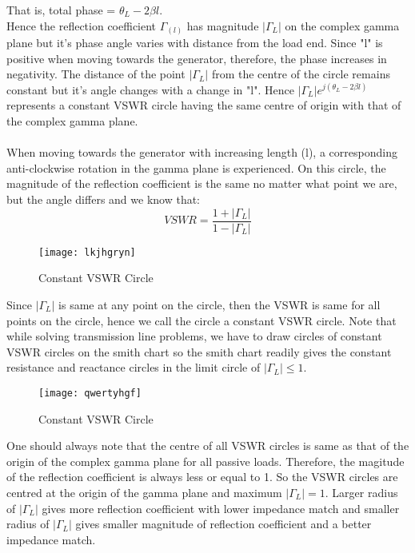 	That is, total phase = $\theta_L - 2\beta{l}$.\\
	Hence the reflection coefficient $\Gamma_{(l)}$ has magnitude $|\Gamma_L|$ on the complex gamma plane but it's phase angle varies with distance from the load end. Since "l" is positive when moving towards the generator, therefore, the phase increases in negativity. The distance of the point $|\Gamma_L|$ from the centre of the circle remains constant but it's angle changes with a change in "l". Hence $|\Gamma_L|e^{j(\theta_L - 2\beta l)}$ represents a constant VSWR circle having the same centre of origin with that of the complex gamma plane.\\\\
   When moving towards the generator with increasing length (l), a corresponding anti-clockwise rotation in the gamma plane is experienced. On this circle, the magnitude of the reflection coefficient is the same no matter what point we are, but the angle differs and we know that:
   \begin{equation}
    	VSWR = \frac{1 + |\Gamma_L|}{1 - |\Gamma_L|}
    \end{equation}
   \begin{figure}[h]
   \centering
   \texttt{[image: lkjhgryn]}
   \caption{Constant VSWR Circle}
   \label{fig:lkjhgryn}
   \end{figure}
   	
	Since $|\Gamma_L|$ is same at any point on the circle, then the VSWR is same for all points on the circle, hence we call the circle a constant VSWR circle. Note that while solving transmission line problems, we have to draw circles of constant VSWR circles on the smith chart so the smith chart readily gives the constant resistance and reactance circles in the limit circle of $|\Gamma_L|\leq 1$.
  	\begin{figure}[h]
  		\centering
  		\texttt{[image: qwertyhgf]}
  		\caption{Constant VSWR Circle}
  		\label{fig:qwertyhgf}
  	\end{figure}
  	

	One should always note that the centre of all VSWR circles is same as that of the origin of  the complex gamma plane for all passive loads. Therefore, the magitude of the reflection coefficient is always less or equal to 1. So the VSWR circles are centred at the origin of the gamma plane and maximum $|\Gamma_L|=1$. Larger radius of $|\Gamma_L|$ gives more reflection coefficient with lower impedance match and smaller radius of  $|\Gamma_L|$ gives smaller magnitude of reflection coefficient and a better impedance match.
	
